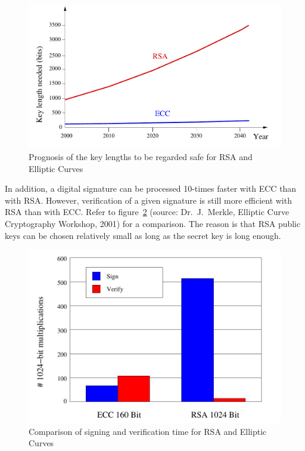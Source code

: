 \begin{figure}[h]
\begin{center}
\includegraphics[scale=0.7]{figures/RSAKeyLength-2}
\caption{Prognosis of the key lengths to be regarded safe for RSA and
  Elliptic Curves\vspace{1ex}} 
\label{RSAKeylength}
\end{center}
\end{figure}

In addition, a digital signature can be processed 10-times faster with ECC
than with RSA.  However, verification of a given signature is still more
efficient with RSA than with ECC. Refer to
figure~\ref{ThousandBitMultiplications} (source: Dr.~J.\ Merkle, Elliptic
Curve Cryptography Workshop, 2001) for a comparison.  The reason is that
RSA public keys can be chosen relatively small as long as the secret key is
long enough.

\begin{figure}[h]
\begin{center}
\vspace{1.5cm}\includegraphics[scale=0.7]{figures/ECCRSA}
\caption{Comparison of signing and verification time for RSA and Elliptic Curves} 
\label{ThousandBitMultiplications}
\end{center}
\end{figure}


